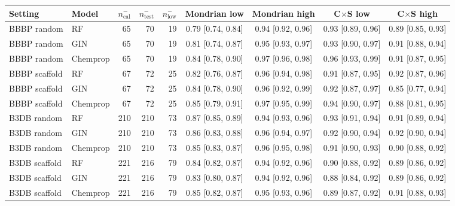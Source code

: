 \begin{tabular}{llrrrcccc}
\toprule
Setting & Model & $n^{-}_{\mathrm{cal}}$ & $n^{-}_{\mathrm{test}}$ & $n^{-}_{\mathrm{low}}$ & Mondrian low & Mondrian high & C$\times$S low & C$\times$S high\\
\midrule
BBBP random & RF & 65 & 70 & 19 & 0.79 [0.74, 0.84] & 0.94 [0.92, 0.96] & 0.93 [0.89, 0.96] & 0.89 [0.85, 0.93]\\
BBBP random & GIN & 65 & 70 & 19 & 0.81 [0.74, 0.87] & 0.95 [0.93, 0.97] & 0.93 [0.90, 0.97] & 0.91 [0.88, 0.94]\\
BBBP random & Chemprop & 65 & 70 & 19 & 0.84 [0.78, 0.90] & 0.97 [0.96, 0.98] & 0.96 [0.93, 0.99] & 0.91 [0.87, 0.95]\\
BBBP scaffold & RF & 67 & 72 & 25 & 0.82 [0.76, 0.87] & 0.96 [0.94, 0.98] & 0.91 [0.87, 0.95] & 0.92 [0.87, 0.96]\\
BBBP scaffold & GIN & 67 & 72 & 25 & 0.84 [0.78, 0.90] & 0.96 [0.92, 0.99] & 0.92 [0.87, 0.97] & 0.85 [0.77, 0.94]\\
BBBP scaffold & Chemprop & 67 & 72 & 25 & 0.85 [0.79, 0.91] & 0.97 [0.95, 0.99] & 0.94 [0.90, 0.97] & 0.88 [0.81, 0.95]\\
B3DB random & RF & 210 & 210 & 73 & 0.87 [0.85, 0.89] & 0.94 [0.93, 0.96] & 0.93 [0.91, 0.94] & 0.91 [0.89, 0.94]\\
B3DB random & GIN & 210 & 210 & 73 & 0.86 [0.83, 0.88] & 0.96 [0.94, 0.97] & 0.92 [0.90, 0.94] & 0.92 [0.90, 0.94]\\
B3DB random & Chemprop & 210 & 210 & 73 & 0.85 [0.83, 0.87] & 0.96 [0.95, 0.98] & 0.91 [0.90, 0.93] & 0.90 [0.88, 0.92]\\
B3DB scaffold & RF & 221 & 216 & 79 & 0.84 [0.82, 0.87] & 0.94 [0.92, 0.96] & 0.90 [0.88, 0.92] & 0.89 [0.86, 0.92]\\
B3DB scaffold & GIN & 221 & 216 & 79 & 0.83 [0.80, 0.87] & 0.94 [0.92, 0.96] & 0.88 [0.84, 0.92] & 0.89 [0.86, 0.92]\\
B3DB scaffold & Chemprop & 221 & 216 & 79 & 0.85 [0.82, 0.87] & 0.95 [0.93, 0.96] & 0.89 [0.87, 0.92] & 0.91 [0.88, 0.93]\\
\bottomrule
\end{tabular}

